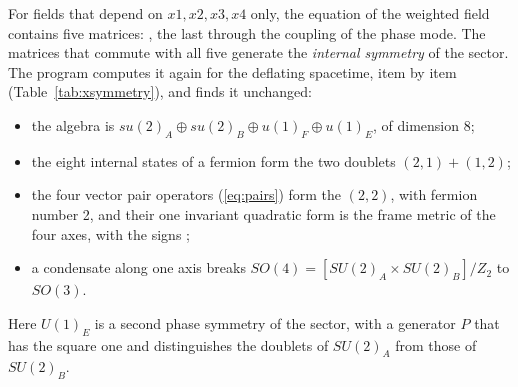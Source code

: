 For fields that depend on $x1,x2,x3,x4$ only, the equation of the weighted field contains five
matrices: , the last through the coupling of the phase mode. The matrices that commute
with all five generate the \emph{internal symmetry} of the sector. The program computes it again for
the deflating spacetime, item by item (Table~\ref{tab:xsymmetry}), and finds it unchanged:
\begin{itemize}
\item the algebra is $su(2)_A\oplus su(2)_B\oplus u(1)_F\oplus u(1)_E$, of dimension 8;
\item the eight internal states of a fermion form the two doublets $(2,1)+(1,2)$;
\item the four vector pair operators (\ref{eq:pairs}) form the $(2,2)$, with fermion number 2, and
their one invariant quadratic form is the frame metric of the four axes, with the signs
;
\item a condensate along one axis breaks $SO(4)=[SU(2)_A\times SU(2)_B]/Z_2$ to $SO(3)$.
\end{itemize}
Here $U(1)_E$ is a second phase symmetry of the sector, with a generator $P$ that has the square one
and distinguishes the doublets of $SU(2)_A$ from those of $SU(2)_B$.

